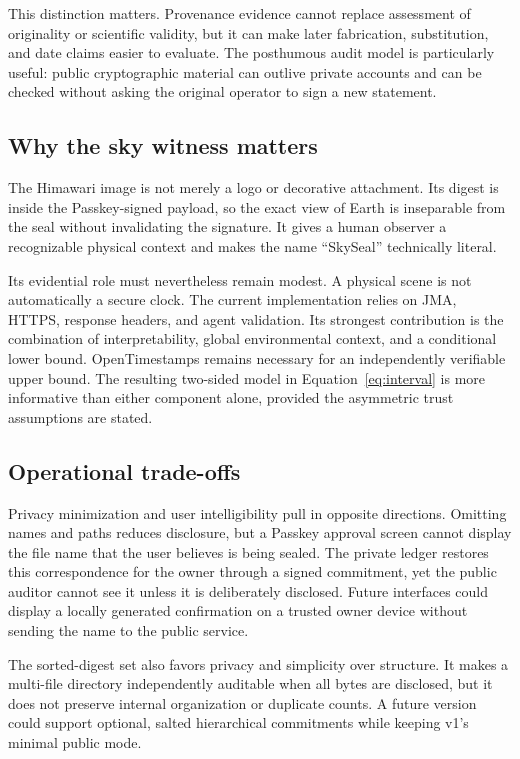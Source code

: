 \documentclass[11pt,a4paper]{article}
\begin{document}
This distinction matters. Provenance evidence cannot replace assessment of originality or scientific validity, but it can make later fabrication, substitution, and date claims easier to evaluate. The posthumous audit model is particularly useful: public cryptographic material can outlive private accounts and can be checked without asking the original operator to sign a new statement.

\subsection{Why the sky witness matters}

The Himawari image is not merely a logo or decorative attachment. Its digest is inside the Passkey-signed payload, so the exact view of Earth is inseparable from the seal without invalidating the signature. It gives a human observer a recognizable physical context and makes the name ``SkySeal'' technically literal.

Its evidential role must nevertheless remain modest. A physical scene is not automatically a secure clock. The current implementation relies on JMA, HTTPS, response headers, and agent validation. Its strongest contribution is the combination of interpretability, global environmental context, and a conditional lower bound. OpenTimestamps remains necessary for an independently verifiable upper bound. The resulting two-sided model in Equation~\ref{eq:interval} is more informative than either component alone, provided the asymmetric trust assumptions are stated.

\subsection{Operational trade-offs}

Privacy minimization and user intelligibility pull in opposite directions. Omitting names and paths reduces disclosure, but a Passkey approval screen cannot display the file name that the user believes is being sealed. The private ledger restores this correspondence for the owner through a signed commitment, yet the public auditor cannot see it unless it is deliberately disclosed. Future interfaces could display a locally generated confirmation on a trusted owner device without sending the name to the public service.

The sorted-digest set also favors privacy and simplicity over structure. It makes a multi-file directory independently auditable when all bytes are disclosed, but it does not preserve internal organization or duplicate counts. A future version could support optional, salted hierarchical commitments while keeping v1's minimal public mode.
\end{document}
